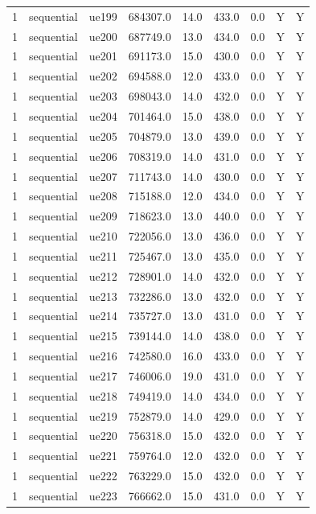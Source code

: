 \begin{table}[ht]
\begin{tabular}{|c|c|c|c|c|c|c|c|c|}
1 & sequential & ue199 & 684307.0 & 14.0 & 433.0 & 0.0 & Y & Y \\
1 & sequential & ue200 & 687749.0 & 13.0 & 434.0 & 0.0 & Y & Y \\
1 & sequential & ue201 & 691173.0 & 15.0 & 430.0 & 0.0 & Y & Y \\
1 & sequential & ue202 & 694588.0 & 12.0 & 433.0 & 0.0 & Y & Y \\
1 & sequential & ue203 & 698043.0 & 14.0 & 432.0 & 0.0 & Y & Y \\
1 & sequential & ue204 & 701464.0 & 15.0 & 438.0 & 0.0 & Y & Y \\
1 & sequential & ue205 & 704879.0 & 13.0 & 439.0 & 0.0 & Y & Y \\
1 & sequential & ue206 & 708319.0 & 14.0 & 431.0 & 0.0 & Y & Y \\
1 & sequential & ue207 & 711743.0 & 14.0 & 430.0 & 0.0 & Y & Y \\
1 & sequential & ue208 & 715188.0 & 12.0 & 434.0 & 0.0 & Y & Y \\
1 & sequential & ue209 & 718623.0 & 13.0 & 440.0 & 0.0 & Y & Y \\
1 & sequential & ue210 & 722056.0 & 13.0 & 436.0 & 0.0 & Y & Y \\
1 & sequential & ue211 & 725467.0 & 13.0 & 435.0 & 0.0 & Y & Y \\
1 & sequential & ue212 & 728901.0 & 14.0 & 432.0 & 0.0 & Y & Y \\
1 & sequential & ue213 & 732286.0 & 13.0 & 432.0 & 0.0 & Y & Y \\
1 & sequential & ue214 & 735727.0 & 13.0 & 431.0 & 0.0 & Y & Y \\
1 & sequential & ue215 & 739144.0 & 14.0 & 438.0 & 0.0 & Y & Y \\
1 & sequential & ue216 & 742580.0 & 16.0 & 433.0 & 0.0 & Y & Y \\
1 & sequential & ue217 & 746006.0 & 19.0 & 431.0 & 0.0 & Y & Y \\
1 & sequential & ue218 & 749419.0 & 14.0 & 434.0 & 0.0 & Y & Y \\
1 & sequential & ue219 & 752879.0 & 14.0 & 429.0 & 0.0 & Y & Y \\
1 & sequential & ue220 & 756318.0 & 15.0 & 432.0 & 0.0 & Y & Y \\
1 & sequential & ue221 & 759764.0 & 12.0 & 432.0 & 0.0 & Y & Y \\
1 & sequential & ue222 & 763229.0 & 15.0 & 432.0 & 0.0 & Y & Y \\
1 & sequential & ue223 & 766662.0 & 15.0 & 431.0 & 0.0 & Y & Y \\

\end{tabular}
\end{table}

